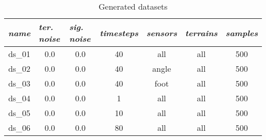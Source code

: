 \begin{table}[H]
\centering
\caption{Generated datasets}
\label{tab:generated_datasets}
\begin{tabular}{|c|c|c|c|c|c|c|}
\hline
\multicolumn{1}{|l|}{\textit{name}} & \multicolumn{1}{l|}{\textit{ter. noise}} & \multicolumn{1}{l|}{\textit{sig. noise}} & \multicolumn{1}{l|}{\textit{timesteps}} & \multicolumn{1}{l|}{\textit{sensors}} & \multicolumn{1}{l|}{\textit{terrains}} & \multicolumn{1}{l|}{\textit{samples}} \\ \hline
ds\_01                              & 0.0                                             & 0.0                                            & 40                                      & all                                   & all                                    & 500                                     \\ \hline
ds\_02                              & 0.0                                             & 0.0                                            & 40                                      & angle                                 & all                                    & 500                                     \\ \hline
ds\_03                              & 0.0                                             & 0.0                                            & 40                                      & foot                                  & all                                    & 500                                     \\ \hline
ds\_04                              & 0.0                                             & 0.0                                            & 1                                       & all                                   & all                                    & 500                                     \\ \hline
ds\_05                              & 0.0                                             & 0.0                                            & 10                                      & all                                   & all                                    & 500                                     \\ \hline
ds\_06                              & 0.0                                             & 0.0                                            & 80                                      & all                                   & all                                    & 500                                     \\ \hline

\end{tabular}
\end{table}
